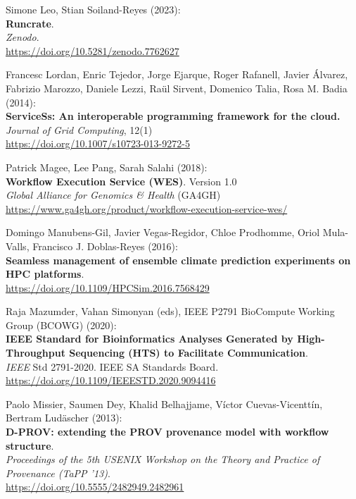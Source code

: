 \documentclass[10pt,letterpaper]{article}
\begin{document}
\begin{thebibliography}{10}
\begin{small}
Simone Leo, Stian Soiland-Reyes (2023):\\
\textbf{Runcrate}.\\
\emph{Zenodo}.\\
\url{https://doi.org/10.5281/zenodo.7762627}

 Francesc Lordan, Enric Tejedor, Jorge Ejarque, Roger
Rafanell, Javier Álvarez, Fabrizio Marozzo, Daniele Lezzi, Raül Sirvent,
Domenico Talia, Rosa M. Badia (2014):\\
\textbf{ServiceSs: An interoperable programming framework for the
cloud.}\\
\emph{Journal of Grid Computing}, 12(1)\\
\url{https://doi.org/10.1007/s10723-013-9272-5}

Patrick Magee, Lee Pang, Sarah Salahi (2018):\\
\textbf{Workflow Execution Service (WES)}. Version 1.0\\
\emph{Global Alliance for Genomics \& Health} (GA4GH)\\
\url{https://www.ga4gh.org/product/workflow-execution-service-wes/}

Domingo Manubens-Gil, Javier Vegas-Regidor, Chloe Prodhomme, Oriol Mula-Valls, Francisco J. Doblas-Reyes (2016):\\
\textbf{Seamless management of ensemble climate prediction experiments on HPC platforms}.\\
\url{https://doi.org/10.1109/HPCSim.2016.7568429}

Raja Mazumder, Vahan Simonyan (eds), IEEE P2791 BioCompute Working Group (BCOWG) (2020):\\
\textbf{IEEE Standard for Bioinformatics Analyses Generated by High-Throughput Sequencing (HTS) to Facilitate Communication}.\\
\emph{IEEE} Std 2791-2020. IEEE SA Standards Board.\\
\url{https://doi.org/10.1109/IEEESTD.2020.9094416}

Paolo Missier, Saumen Dey, Khalid Belhajjame, Víctor Cuevas-Vicenttín, Bertram Ludäscher (2013):\\
\textbf{D-PROV: extending the PROV provenance model with workflow structure}.\\
\emph{Proceedings of the 5th USENIX Workshop on the Theory and Practice of Provenance (TaPP '13)}. \\
\url{https://doi.org/10.5555/2482949.2482961}


\end{small}
\end{thebibliography}
\end{document}
